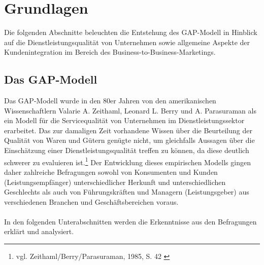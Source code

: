 \chapter{Grundlagen}
\label{kapitel2}
Die folgenden Abschnitte beleuchten die Entstehung des GAP-Modell in Hinblick auf die Dienstleistungsqualität von Unternehmen sowie allgemeine Aspekte der Kundenintegration im Bereich des Business-to-Business-Marketings.
\section{Das GAP-Modell}
Das GAP-Modell wurde in den 80er Jahren von den amerikanischen Wissenschaftlern Valarie A. Zeithaml, Leonard L. Berry und A. Parasuraman als ein Modell für die Servicequalität von Unternehmen im Dienstleistungssektor erarbeitet. Das zur damaligen Zeit vorhandene Wissen über die Beurteilung der Qualität von Waren und Gütern genügte nicht, um gleichfalls Aussagen über die Einschätzung einer Dienstleistungsqualität treffen zu können, da diese deutlich schwerer zu evaluieren ist.\footnote{vgl. Zeithaml/Berry/Parasuraman, 1985, S. 42  \cite{Parasuraman_1985}} Der Entwicklung dieses empirischen Modells gingen daher zahlreiche Befragungen sowohl von Konsumenten und Kunden (Leistungsempfänger) unterschiedlicher Herkunft und unterschiedlichen Geschlechts als auch von Führungskräften und Managern (Leistungsgeber) aus verschiedenen Branchen und Geschäftsbereichen voraus.
\\ \\
In den folgenden Unterabschnitten werden die Erkenntnisse aus den Befragungen erklärt und analysiert.

